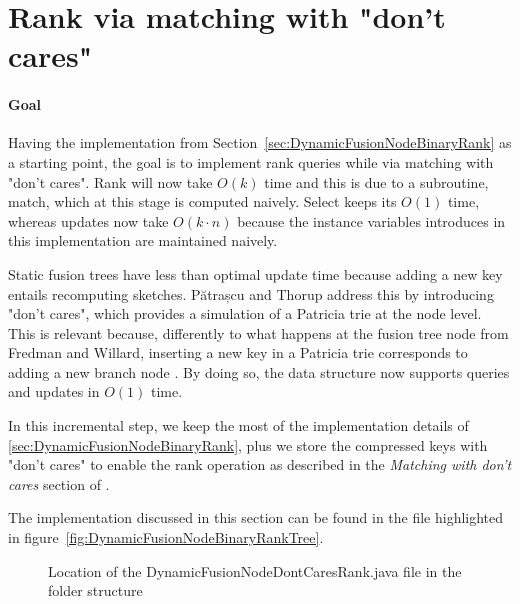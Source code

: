 \newpage
\section{Rank via matching with "don't cares"} \label{sec:rankWithDontCares}

\paragraph*{Goal}
Having the implementation from Section~\ref{sec:DynamicFusionNodeBinaryRank} as a starting point, the goal is to implement rank queries while via matching with "don't cares". Rank will now take $O(k)$ time and this is due to a subroutine, {\ttfamily match}, which at this stage is computed naively. Select keeps its $O(1)$ time, whereas updates now take $O(k\cdot n)$ because the instance variables introduces in this implementation are maintained naively.

Static fusion trees have less than optimal update time because adding a new key entails recomputing sketches. Pătrașcu and Thorup address this by introducing "don't cares", which provides a simulation of a Patricia trie at the node level. This is relevant because, differently to what happens at the fusion tree node from Fredman and Willard, inserting a new key in a Patricia trie corresponds to adding a new branch node \cite{patrascu2014dynamic}. By doing so, the data structure now supports queries and updates in $O(1)$ time.

In this incremental step, we keep the most of the implementation details of \ref{sec:DynamicFusionNodeBinaryRank}, plus we store the compressed keys with "don't cares" to enable the rank operation as described in the \textit{Matching with don't cares} section of \cite{patrascu2014dynamic}.

The implementation discussed in this section can be found in the file highlighted in figure~\ref{fig:DynamicFusionNodeBinaryRankTree}.
\begin{figure}[H]
\caption{Location of the {\ttfamily DynamicFusionNodeDontCaresRank.java} file in the folder structure}
\label{fig:DynamicFusionNodeDontCaresRankTree}
\end{figure}

